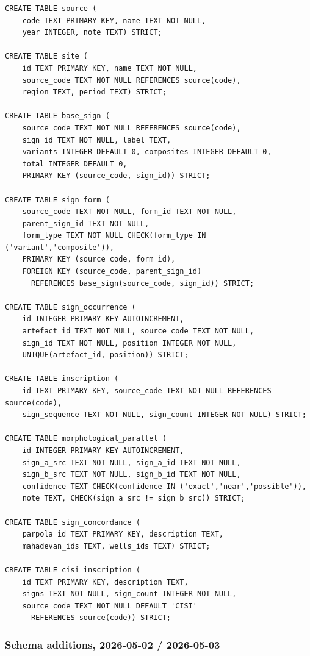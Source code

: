 {\small
\begin{verbatim}
CREATE TABLE source (
    code TEXT PRIMARY KEY, name TEXT NOT NULL,
    year INTEGER, note TEXT) STRICT;

CREATE TABLE site (
    id TEXT PRIMARY KEY, name TEXT NOT NULL,
    source_code TEXT NOT NULL REFERENCES source(code),
    region TEXT, period TEXT) STRICT;

CREATE TABLE base_sign (
    source_code TEXT NOT NULL REFERENCES source(code),
    sign_id TEXT NOT NULL, label TEXT,
    variants INTEGER DEFAULT 0, composites INTEGER DEFAULT 0,
    total INTEGER DEFAULT 0,
    PRIMARY KEY (source_code, sign_id)) STRICT;

CREATE TABLE sign_form (
    source_code TEXT NOT NULL, form_id TEXT NOT NULL,
    parent_sign_id TEXT NOT NULL,
    form_type TEXT NOT NULL CHECK(form_type IN ('variant','composite')),
    PRIMARY KEY (source_code, form_id),
    FOREIGN KEY (source_code, parent_sign_id)
      REFERENCES base_sign(source_code, sign_id)) STRICT;

CREATE TABLE sign_occurrence (
    id INTEGER PRIMARY KEY AUTOINCREMENT,
    artefact_id TEXT NOT NULL, source_code TEXT NOT NULL,
    sign_id TEXT NOT NULL, position INTEGER NOT NULL,
    UNIQUE(artefact_id, position)) STRICT;

CREATE TABLE inscription (
    id TEXT PRIMARY KEY, source_code TEXT NOT NULL REFERENCES source(code),
    sign_sequence TEXT NOT NULL, sign_count INTEGER NOT NULL) STRICT;

CREATE TABLE morphological_parallel (
    id INTEGER PRIMARY KEY AUTOINCREMENT,
    sign_a_src TEXT NOT NULL, sign_a_id TEXT NOT NULL,
    sign_b_src TEXT NOT NULL, sign_b_id TEXT NOT NULL,
    confidence TEXT CHECK(confidence IN ('exact','near','possible')),
    note TEXT, CHECK(sign_a_src != sign_b_src)) STRICT;

CREATE TABLE sign_concordance (
    parpola_id TEXT PRIMARY KEY, description TEXT,
    mahadevan_ids TEXT, wells_ids TEXT) STRICT;

CREATE TABLE cisi_inscription (
    id TEXT PRIMARY KEY, description TEXT,
    signs TEXT NOT NULL, sign_count INTEGER NOT NULL,
    source_code TEXT NOT NULL DEFAULT 'CISI'
      REFERENCES source(code)) STRICT;
\end{verbatim}
}

\subsubsection*{Schema additions, 2026-05-02 / 2026-05-03}

